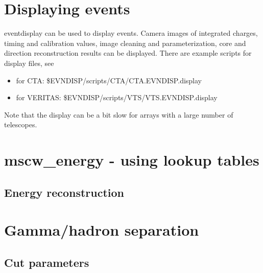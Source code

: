 \documentclass[titlepage,a4paper,twoside,11pt]{report}
\begin{document}
\chapter{Displaying events}

eventdisplay can be used to display events. 
Camera images of integrated charges, timing and calibration values, image cleaning and parameterization, core and direction reconstruction results can be displayed. 
There are example scripts for display files, see

\begin{itemize}
\item for CTA:  \$EVNDISP/scripts/CTA/CTA.EVNDISP.display
\item for VERITAS:  \$EVNDISP/scripts/VTS/VTS.EVNDISP.display
\end{itemize} 

Note that the display can be a bit slow for arrays with a large number of telescopes.

\chapter{mscw\_energy - using lookup tables}

\section{Energy reconstruction}
\label{SECTION.ENERGYRECONSTRUCTION} 





\chapter{Gamma/hadron separation}

\section{Cut parameters}
\label{SECTION.CUTS.PARAMETERFILE}
\end{document}

